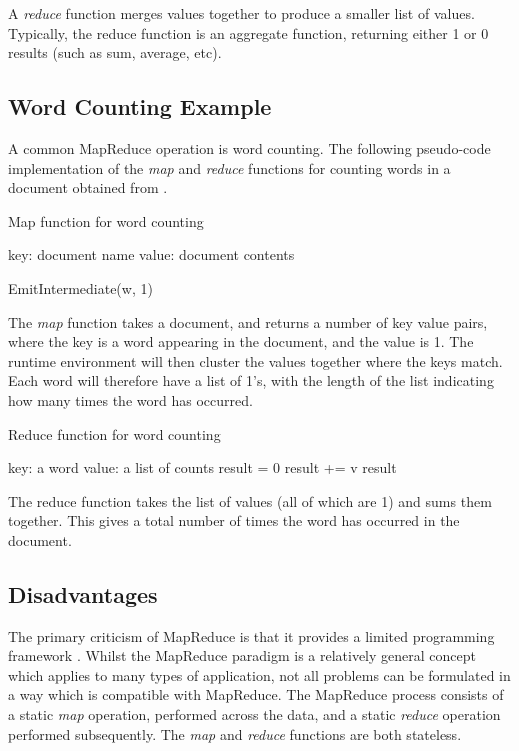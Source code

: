 A \textit{reduce} function merges values together to produce a smaller list of values. Typically, the reduce function is an aggregate function, returning either 1 or 0 results (such as sum, average, etc). 

\subsection{Word Counting Example}
A common MapReduce operation is word counting. The following pseudo-code implementation of the \textit{map} and \textit{reduce} functions for counting words in a document obtained from \cite{dean2004mapreduce}.

\begin{algorithm}
\caption{Map function for word counting}
	\begin{algorithmic}
		\REQUIRE key: document name
		\REQUIRE value: document contents

			\STATE EmitIntermediate(w, 1)
		\ENDFOR
	\end{algorithmic}
\end{algorithm}

The \textit{map} function takes a document, and returns a number of key value pairs, where the key is a word appearing in the document, and the value is 1. The runtime environment will then cluster the values together where the keys match. Each word will therefore have a list of 1's, with the length of the list indicating how many times the word has occurred.

\begin{algorithm}[H]
\caption{Reduce function for word counting}
	\begin{algorithmic}
		\REQUIRE key: a word
		\REQUIRE value: a list of counts
		\STATE result = 0
		\FORALL {v in values}
			\STATE result += v
		\ENDFOR
		\RETURN result
	\end{algorithmic}
\end{algorithm}

The reduce function takes the list of values (all of which are 1) and sums them together. This gives a total number of times the word has occurred in the document.

\subsection{Disadvantages}
The primary criticism of MapReduce is that it provides a limited programming framework \cite{zaharia2010spark}. Whilst the MapReduce paradigm is a relatively general concept which applies to many types of application, not all problems can be formulated in a way which is compatible with MapReduce. The MapReduce process consists of a static \textit{map} operation, performed across the data, and a static \textit{reduce} operation performed subsequently. The \textit{map} and \textit{reduce} functions are both stateless. 

